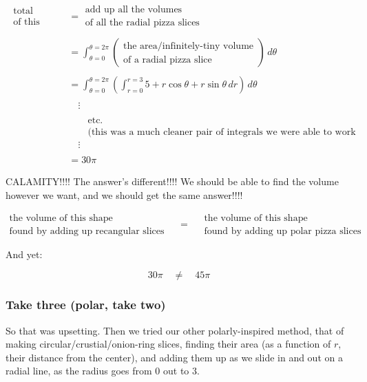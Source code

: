 \documentclass[
]{article}
\begin{document}
\begin{align*}
\substack{\text{total volume}\\\text{of this shape}} &= \substack{\text{add up all the volumes}\\\text{of all the radial pizza slices}} \\ \\
&= \int_{\theta = 0}^{\theta = 2\pi} \left(\substack{\text{the area/infinitely-tiny volume}\\\text{of a radial pizza slice}}\right) \, d\theta \\ \\
&= \int_{\theta = 0}^{\theta = 2\pi} \left(  \int_{r=0}^{r=3} 5 + r\cos\theta + r\sin\theta \, dr \right) \, d\theta \\ \\
&\quad \vdots \\ \\
&\quad\quad \text{etc.} \\
&\quad\quad \text{(this was a much cleaner pair of integrals we were able to work out by hand)} \\
&\quad \vdots \\ \\
&= 30\pi
\end{align*}

CALAMITY!!!! The answer's different!!!! We should be able to find the volume however we want, and we should get the same answer!!!!

\[\substack{\text{the volume of this shape}\\\text{found by adding up recangular slices}} \quad=\quad \substack{\text{the volume of this shape}\\\text{found by adding up polar pizza slices}} \]

And yet:

\[30\pi \quad\neq\quad 45\pi\]

\hypertarget{take-three-polar-take-two}{%
\subsubsection{Take three (polar, take two)}\label{take-three-polar-take-two}}

So that was upsetting. Then we tried our other polarly-inspired method, that of making circular/crustial/onion-ring slices, finding their area (as a function of \(r\), their distance from the center), and adding them up as we slide in and out on a radial line, as the radius goes from \(0\) out to \(3\).
\end{document}
